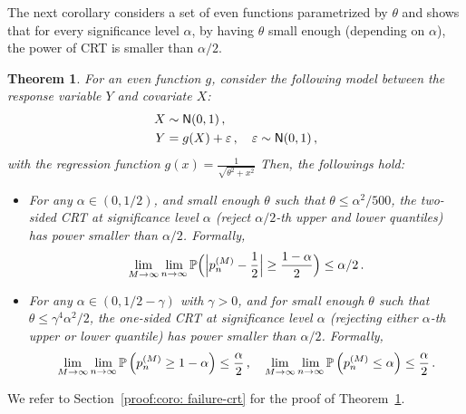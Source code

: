 \documentclass[11pt]{article}
\newtheorem{thm}[propo]{Theorem}
\def\normal{\mathsf{N}}
\begin{document}
 The next corollary considers a set of even functions parametrized by $\theta$ and shows that for every significance level  $\alpha$, by having $\theta$ small enough (depending on $\alpha$), the power of CRT is smaller than $\alpha/2$.
\begin{thm}\label{coro: failure-crt}
  For an even function $g$,  consider the following model between the response variable $Y$ and covariate $X$:
  \begin{align*} 
X&\sim \normal(0,1)\,, \nonumber \\
Y&=g(X)+\eps\,,\quad \eps\sim \normal(0,1)\,,
\end{align*}
with the regression function $g(x)=\frac{1}{\sqrt{\theta^2+x^2}}$ 
Then, the followings hold:
 \begin{itemize} 
  \item[$(a)$]For any $\alpha\in (0,1/2)$, and small enough $\theta$ such that  $\theta\leq \alpha^2/500$,  the two-sided CRT at significance level $\alpha$ (reject $\alpha/2$-th upper and lower quantiles) has power smaller than $\alpha/2$. Formally, 
\[
\lim\limits_{M\rightarrow \infty}^{} \lim\limits_{n\rightarrow \infty}^{}{\mathbb P}\Big(  \Big|p_{n}^{(M)}  -\frac{1}{2} \Big|   \geq  \frac{1-\alpha}{2} \Big)\leq  \alpha/2 \,.
\]    
   
    \item[$(b)$] For any $\alpha\in (0,1/2-\gamma)$ with $\gamma>0$, and for small enough $\theta$ such that $\theta\leq \gamma^4\alpha^2/2$, the one-sided CRT at significance level $\alpha$ (rejecting either $\alpha$-th upper or lower quantile) has power smaller than $\alpha/2$. Formally,
    \begin{align*}
\lim\limits_{M\rightarrow \infty}^{} \lim\limits_{n\rightarrow \infty}^{}{\mathbb P}\left(  p_{n}^{(M)}   \geq  1-\alpha \right) \leq \frac{\alpha}{2}\,,\quad
\lim\limits_{M\rightarrow \infty}^{} \lim\limits_{n\rightarrow \infty}^{}{\mathbb P}\left(  p_{n}^{(M)}   \leq  \alpha \right) \leq \frac{\alpha}{2}\,.
\end{align*}
\end{itemize}

\end{thm}
We refer to Section~\ref{proof:coro: failure-crt} for the proof of Theorem~\ref{coro: failure-crt}.
\end{document}
